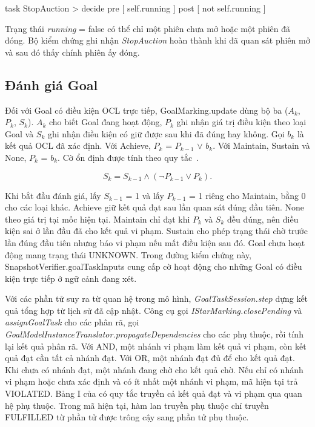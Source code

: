 \documentclass[12pt,a4paper,oneside]{extreport}
\newcommand{\thesisdisplaytitle}[2]{%
  \par\smallskip\noindent\makebox[\linewidth][c]{\small\textbf{#1}\ #2}\par\nobreak}
\begin{document}
\begin{samepage}

\thesisdisplaytitle{Đoạn mã 2.3}{Điều kiện của \textit{StopAuction}}

\begin{thesiscode}
task StopAuction > decide
    pre {[ self.running ]}
    post {[ not self.running ]}
\end{thesiscode}

\end{samepage}

Trạng thái \textit{running} = false có thể chỉ một phiên chưa mở hoặc một phiên đã đóng. Bộ kiểm chứng ghi nhận \textit{StopAuction} hoàn thành khi đã quan sát phiên mở và sau đó thấy chính phiên ấy đóng.

\subsection{Đánh giá Goal}\label{sec:2-7-3}

Đối với Goal có điều kiện OCL trực tiếp, GoalMarking.update dùng bộ ba (\(A_{k}\), \(P_{k}\), \(S_{k}\)). \(A_{k}\) cho biết Goal đang hoạt động, \(P_{k}\) ghi nhận giá trị điều kiện theo loại Goal và \(S_{k}\) ghi nhận điều kiện có giữ được sau khi đã đúng hay không. Gọi \(b_{k}\) là kết quả OCL đã xác định. Với Achieve, \(P_{k}\) = \(P_{k-1}\) \(\lor\) \(b_{k}\). Với Maintain, Sustain và None, \(P_{k}\) = \(b_{k}\). Cờ ổn định được tính theo quy tắc~\cite{ref-28}.

\[S_{k} = S_{k - 1} \land \left( \neg P_{k - 1} \vee P_{k} \right).\]

Khi bắt đầu đánh giá, lấy \(S_{k-1}\) = 1 và lấy \(P_{k-1}\) = 1 riêng cho Maintain, bằng 0 cho các loại khác. Achieve giữ kết quả đạt sau lần quan sát đúng đầu tiên. None theo giá trị tại mốc hiện tại. Maintain chỉ đạt khi \(P_{k}\) và \(S_{k}\) đều đúng, nên điều kiện sai ở lần đầu đã cho kết quả vi phạm. Sustain cho phép trạng thái chờ trước lần đúng đầu tiên nhưng báo vi phạm nếu mất điều kiện sau đó. Goal chưa hoạt động mang trạng thái UNKNOWN. Trong đường kiểm chứng này, SnapshotVerifier.goalTaskInputs cung cấp cờ hoạt động cho những Goal có điều kiện trực tiếp ở ngữ cảnh đang xét.

Với các phần tử suy ra từ quan hệ trong mô hình, \textit{GoalTaskSession.step} dựng kết quả tổng hợp từ lịch sử đã cập nhật. Công cụ gọi \textit{IStarMarking.closePending} và \textit{assignGoalTask} cho các phân rã, gọi \textit{GoalModelInstanceTranslator.propagateDependencies} cho các phụ thuộc, rồi tính lại kết quả phân rã. Với AND, một nhánh vi phạm làm kết quả vi phạm, còn kết quả đạt cần tất cả nhánh đạt. Với OR, một nhánh đạt đủ để cho kết quả đạt. Khi chưa có nhánh đạt, một nhánh đang chờ cho kết quả chờ. Nếu chỉ có nhánh vi phạm hoặc chưa xác định và có ít nhất một nhánh vi phạm, mã hiện tại trả VIOLATED. Bảng I của \cite{ref-28} có quy tắc truyền cả kết quả đạt và vi phạm qua quan hệ phụ thuộc. Trong mã hiện tại, hàm lan truyền phụ thuộc chỉ truyền FULFILLED từ phần tử được trông cậy sang phần tử phụ thuộc.
\end{document}
